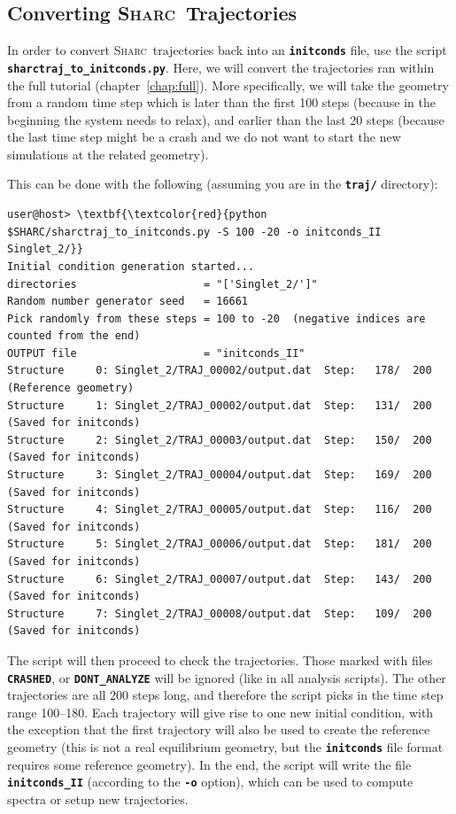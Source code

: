 \documentclass[a4paper,11pt,DIV=15,openany]{scrbook}
\newcommand{\sharc}{\textsc{Sharc}}
\newcommand{\ttt}[1]{\textbf{\texttt{#1}}}
\begin{document}
\subsection{Converting \sharc\ Trajectories}

In order to convert \sharc\ trajectories back into an \ttt{initconds} file, use the script \ttt{sharctraj\_to\_initconds.py}.
Here, we will convert the trajectories ran within the full tutorial (chapter~\ref{chap:full}).
More specifically, we will take the geometry from a random time step which is later than the first 100 steps (because in the beginning the system needs to relax), and earlier than the last 20 steps (because the last time step might be a crash and we do not want to start the new simulations at the related geometry).

This can be done with the following (assuming you are in the \ttt{traj/} directory):
\begin{oframed}
\footnotesize\begin{Verbatim}[commandchars=\\\{\}]
user@host> \textbf{\textcolor{red}{python $SHARC/sharctraj_to_initconds.py -S 100 -20 -o initconds_II Singlet_2/}}
Initial condition generation started...
directories                    = "['Singlet_2/']"
Random number generator seed   = 16661
Pick randomly from these steps = 100 to -20  (negative indices are counted from the end)
OUTPUT file                    = "initconds_II"
Structure     0: Singlet_2/TRAJ_00002/output.dat  Step:   178/  200  (Reference geometry)
Structure     1: Singlet_2/TRAJ_00002/output.dat  Step:   131/  200  (Saved for initconds)
Structure     2: Singlet_2/TRAJ_00003/output.dat  Step:   150/  200  (Saved for initconds)
Structure     3: Singlet_2/TRAJ_00004/output.dat  Step:   169/  200  (Saved for initconds)
Structure     4: Singlet_2/TRAJ_00005/output.dat  Step:   116/  200  (Saved for initconds)
Structure     5: Singlet_2/TRAJ_00006/output.dat  Step:   181/  200  (Saved for initconds)
Structure     6: Singlet_2/TRAJ_00007/output.dat  Step:   143/  200  (Saved for initconds)
Structure     7: Singlet_2/TRAJ_00008/output.dat  Step:   109/  200  (Saved for initconds)
\end{Verbatim}
\end{oframed}

\normalsize
The script will then proceed to check the trajectories.
Those marked with files \ttt{CRASHED}, or \ttt{DONT\_ANALYZE} will be ignored (like in all analysis scripts).
The other trajectories are all 200 steps long, and therefore the script picks in the time step range 100--180.
Each trajectory will give rise to one new initial condition, with the exception that the first trajectory will also be used to create the reference geometry (this is not a real equilibrium geometry, but the \ttt{initconds} file format requires some reference geometry).
In the end, the script will write the file \ttt{initconds\_II} (according to the \ttt{-o} option), which can be used to compute spectra or setup new trajectories.
\end{document}
